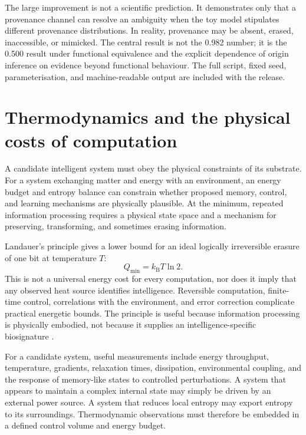 \documentclass[11pt]{article}
\begin{document}
The large improvement is not a scientific prediction. It demonstrates only that a provenance channel can resolve an ambiguity when the toy model stipulates different provenance distributions. In reality, provenance may be absent, erased, inaccessible, or mimicked. The central result is not the 0.982 number; it is the 0.500 result under functional equivalence and the explicit dependence of origin inference on evidence beyond functional behaviour. The full script, fixed seed, parameterisation, and machine-readable output are included with the release.

\section{Thermodynamics and the physical costs of computation}

A candidate intelligent system must obey the physical constraints of its substrate. For a system exchanging matter and energy with an environment, an energy budget and entropy balance can constrain whether proposed memory, control, and learning mechanisms are physically plausible. At the minimum, repeated information processing requires a physical state space and a mechanism for preserving, transforming, and sometimes erasing information.

Landauer's principle gives a lower bound for an ideal logically irreversible erasure of one bit at temperature $T$:
\begin{equation}
  Q_{\min}=k_{\mathrm B}T\ln 2.
  \label{eq:landauer}
\end{equation}
This is not a universal energy cost for every computation, nor does it imply that any observed heat source identifies intelligence. Reversible computation, finite-time control, correlations with the environment, and error correction complicate practical energetic bounds. The principle is useful because information processing is physically embodied, not because it supplies an intelligence-specific biosignature \citep{Landauer1961,Wimsatt2021}.

For a candidate system, useful measurements include energy throughput, temperature, gradients, relaxation times, dissipation, environmental coupling, and the response of memory-like states to controlled perturbations. A system that appears to maintain a complex internal state may simply be driven by an external power source. A system that reduces local entropy may export entropy to its surroundings. Thermodynamic observations must therefore be embedded in a defined control volume and energy budget.
\end{document}
